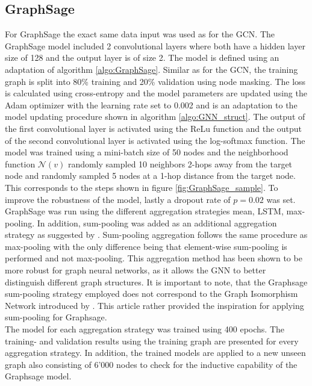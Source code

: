   \subsection{GraphSage}

  For GraphSage the exact same data input was used as for the GCN. The 
  GraphSage model included 2 convolutional layers where both have a hidden 
  layer size of 128 and the output layer is of size 2. The model is defined
  using an adaptation of algorithm \ref{algo:GraphSage}. Similar as for the 
  GCN, the training graph is split into 80\% training and 20\% validation using 
  node masking. The loss is calculated using cross-entropy and the model 
  parameters are updated using the Adam optimizer with the learning rate set to 
  0.002 and is an adaptation to the model updating procedure shown in 
  algorithm \ref{algo:GNN_struct}. The output of the first convolutional layer 
  is activated using the ReLu function and the output of the second 
  convolutional layer is activated using the log-softmax function. The model was 
  trained using a mini-batch size of 50 nodes and the neighborhood function 
  $\mathcal{N}(v)$ randomly sampled 10 neighbors 2-hops away from the target
  node and randomly sampled 5 nodes at a 1-hop distance from the target node. 
  This corresponds to the steps shown in figure \ref{fig:GraphSage_sample}. 
  To improve the robustness of the model, lastly a dropout rate of $p = 0.02$ 
  was set. GraphSage was run using the different aggregation strategies mean, 
  LSTM, max-pooling. In addition, sum-pooling was added as an additional 
  aggregation strategy as suggested by \cite{xu2018powerful}. Sum-pooling 
  aggregation follows the same procedure as max-pooling with the only difference 
  being that element-wise sum-pooling is performed and not max-pooling. This 
  aggregation method has been shown to be more robust for graph neural networks, 
  as it allows the GNN to better distinguish different graph structures. It is
  important to note, that the Graphsage sum-pooling strategy employed does not
  correspond to the Graph Isomorphism Network introduced by 
  \cite{xu2018powerful}. This article rather provided the inspiration for
  applying sum-pooling for Graphsage. \\
  
  \noindent The model for each aggregation strategy was trained using 400 epochs. 
  The training- and validation results using the training graph are presented 
  for every aggregation strategy. In addition, the trained models are applied 
  to a new unseen graph also consisting of 6'000 nodes to check for the 
  inductive capability of the Graphsage model. 

